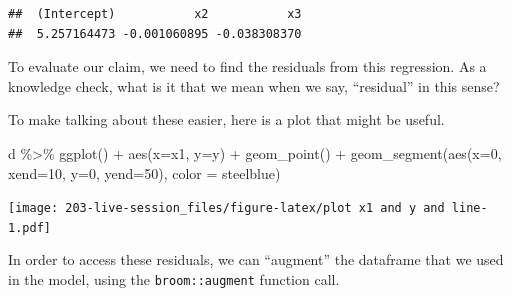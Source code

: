 \documentclass[
]{book}
\newenvironment{Shaded}{\begin{snugshade}}{\end{snugshade}}
\newcommand{\AttributeTok}[1]{\textcolor[rgb]{0.77,0.63,0.00}{#1}}
\newcommand{\DecValTok}[1]{\textcolor[rgb]{0.00,0.00,0.81}{#1}}
\newcommand{\FunctionTok}[1]{\textcolor[rgb]{0.00,0.00,0.00}{#1}}
\newcommand{\NormalTok}[1]{#1}
\newcommand{\OtherTok}[1]{\textcolor[rgb]{0.56,0.35,0.01}{#1}}
\newcommand{\SpecialCharTok}[1]{\textcolor[rgb]{0.00,0.00,0.00}{#1}}
\newcommand{\StringTok}[1]{\textcolor[rgb]{0.31,0.60,0.02}{#1}}
\theoremstyle{definition}
\theoremstyle{definition}
\theoremstyle{definition}
\theoremstyle{definition}
\theoremstyle{remark}
\begin{document}
\begin{verbatim}
##  (Intercept)           x2           x3 
##  5.257164473 -0.001060895 -0.038308370
\end{verbatim}

To evaluate our claim, we need to find the residuals from this regression. As a knowledge check, what is it that we mean when we say, ``residual'' in this sense?

To make talking about these easier, here is a plot that might be useful.

\begin{Shaded}
\begin{Highlighting}[]
\NormalTok{d }\SpecialCharTok{\%\textgreater{}\%} 
  \FunctionTok{ggplot}\NormalTok{() }\SpecialCharTok{+} 
  \FunctionTok{aes}\NormalTok{(}\AttributeTok{x=}\NormalTok{x1, }\AttributeTok{y=}\NormalTok{y) }\SpecialCharTok{+} 
  \FunctionTok{geom\_point}\NormalTok{() }\SpecialCharTok{+} 
  \FunctionTok{geom\_segment}\NormalTok{(}\FunctionTok{aes}\NormalTok{(}\AttributeTok{x=}\DecValTok{0}\NormalTok{, }\AttributeTok{xend=}\DecValTok{10}\NormalTok{, }\AttributeTok{y=}\DecValTok{0}\NormalTok{, }\AttributeTok{yend=}\DecValTok{50}\NormalTok{), }\AttributeTok{color =} \StringTok{\textquotesingle{}steelblue\textquotesingle{}}\NormalTok{)}
\end{Highlighting}
\end{Shaded}

\texttt{[image: 203-live-session\_files/figure-latex/plot x1 and y and line-1.pdf]}

In order to access these residuals, we can ``augment'' the dataframe that we used in the model, using the \texttt{broom::augment} function call.

\begin{Shaded}
\end{Shaded}
\end{document}
